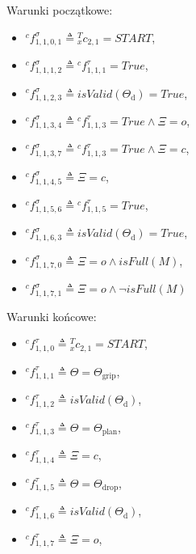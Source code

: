 Warunki początkowe:
\begin{itemize}
    \item ${}^{c}f^{\sigma}_{1,1,0,1} \triangleq {}^{T}_{x}c_{2,1} = START$,
    \item ${}^{c}f^{\sigma}_{1,1,1,2} \triangleq {}^{c}f^{\tau}_{1,1,1} = True$,
    \item ${}^{c}f^{\sigma}_{1,1,2,3} \triangleq isValid(\Theta_{\mathrm{d}}) = True$,
    
   
    \item ${}^{c}f^{\sigma}_{1,1,3,4} \triangleq {}^{c}f^{\tau}_{1,1,3} = True \land \Xi = o$, 
    \item ${}^{c}f^{\sigma}_{1,1,3,7} \triangleq {}^{c}f^{\tau}_{1,1,3} = True \land \Xi = c$, 

    \item ${}^{c}f^{\sigma}_{1,1,4,5} \triangleq \Xi = c$,
    \item ${}^{c}f^{\sigma}_{1,1,5,6} \triangleq {}^{c}f^{\tau}_{1,1,5} = True$,
    \item ${}^{c}f^{\sigma}_{1,1,6,3} \triangleq isValid(\Theta_{\mathrm{d}}) = True$,
    \item ${}^{c}f^{\sigma}_{1,1,7,0} \triangleq \Xi = o \land isFull(M)$,
    \item ${}^{c}f^{\sigma}_{1,1,7,1} \triangleq \Xi = o \land \neg isFull(M)$ 
\end{itemize}

Warunki końcowe:
\begin{itemize}
    \item ${}^{c}f^{\tau}_{1,1,0} \triangleq {}^{T}_{x}c_{2,1} = START $,
    \item ${}^{c}f^{\tau}_{1,1,1} \triangleq \Theta = \Theta_{\mathrm{grip}}$,
    \item ${}^{c}f^{\tau}_{1,1,2} \triangleq isValid(\Theta_{\mathrm{d}})$,
    \item ${}^{c}f^{\tau}_{1,1,3} \triangleq \Theta = \Theta_{\mathrm{plan}}$,
    \item ${}^{c}f^{\tau}_{1,1,4} \triangleq \Xi = c$,
    \item ${}^{c}f^{\tau}_{1,1,5} \triangleq \Theta = \Theta_{\mathrm{drop}}$,
    \item ${}^{c}f^{\tau}_{1,1,6} \triangleq isValid(\Theta_{\mathrm{d}})$,
    \item ${}^{c}f^{\tau}_{1,1,7} \triangleq \Xi = o$,
\end{itemize}

